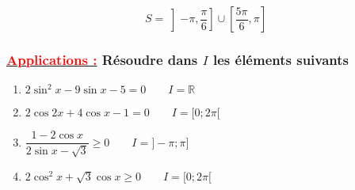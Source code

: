 \documentclass[a4paper,12pt]{article}
\begin{document}
\[
\boxed{S = \left]-\pi,\frac{\pi}{6}\right] \cup \left[\frac{5\pi}{6},\pi\right]}
\]

\subsubsection*{\underline{\textcolor{red}{Applications :}} Résoudre dans $I$ les éléments suivants}

\begin{enumerate}
    \item $2\sin^2 x - 9\sin x - 5 = 0 \qquad I = \mathbb{R}$
    
    \item $2\cos 2x + 4\cos x - 1 = 0 \qquad I = [0 ; 2\pi[$
    
    \item $\dfrac{1 - 2\cos x}{2\sin x - \sqrt{3}} \geq 0 \qquad I = ]-\pi ; \pi]$
    
    \item $2\cos^2 x + \sqrt{3}\cos x \geq 0 \qquad I = [0 ; 2\pi[$
\end{enumerate}
\end{document}
